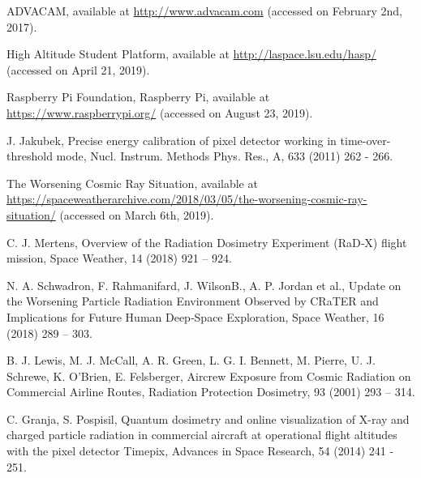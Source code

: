 \begin{thebibliography}{00}
  ADVACAM, available at \url{http://www.advacam.com} (accessed on February 2nd, 2017).
  
  High Altitude Student Platform, available at \url{http://laspace.lsu.edu/hasp/} (accessed on April 21, 2019).
  
  Raspberry Pi Foundation, Raspberry Pi, available at \url{https://www.raspberrypi.org/} (accessed on August 23, 2019).

  J. Jakubek, Precise energy calibration of pixel detector working in time-over-threshold mode, Nucl. Instrum. Methods Phys. Res., A, 633 (2011) 262 - 266.

The Worsening Cosmic Ray Situation, available at \url{https://spaceweatherarchive.com/2018/03/05/the-worsening-cosmic-ray-situation/} (accessed on March 6th, 2019).  

 C. J. Mertens, Overview of the Radiation Dosimetry Experiment (RaD‐X) flight mission, Space Weather, 14 (2018) 921 – 924.  
  
 N. A. Schwadron, F. Rahmanifard, J. WilsonB., A. P. Jordan et al., Update on the Worsening Particle Radiation Environment Observed by CRaTER and Implications for Future Human Deep‐Space Exploration, Space Weather, 16 (2018) 289 – 303.  
  
 B. J. Lewis, M. J. McCall, A. R. Green, L. G. I. Bennett, M. Pierre, U. J. Schrewe, K. O'Brien, E. Felsberger, Aircrew Exposure from Cosmic Radiation on Commercial Airline Routes, Radiation Protection Dosimetry, 93 (2001) 293 – 314.
  
 C. Granja, S. Pospisil, Quantum dosimetry and online visualization of X-ray and charged particle radiation in commercial aircraft at operational flight altitudes with the pixel detector Timepix, Advances in Space Research, 54 (2014) 241 - 251.


\end{thebibliography}
